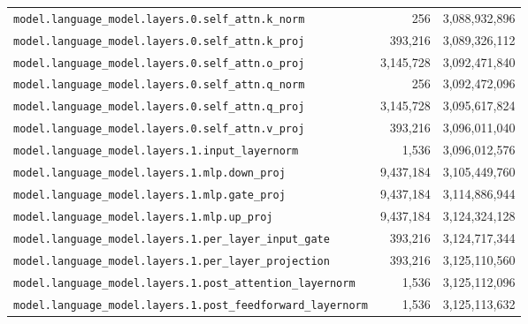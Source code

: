 \documentclass[10pt,a4paper]{article}
\theoremstyle{definition}
\begin{document}
\begin{appendices}
\begin{longtable}{p{9.5cm}rr}
\texttt{model.\allowbreak{}language\_model.\allowbreak{}layers.\allowbreak{}0.\allowbreak{}self\_attn.\allowbreak{}k\_norm} & 256 & 3,088,932,896 \\
\texttt{model.\allowbreak{}language\_model.\allowbreak{}layers.\allowbreak{}0.\allowbreak{}self\_attn.\allowbreak{}k\_proj} & 393,216 & 3,089,326,112 \\
\texttt{model.\allowbreak{}language\_model.\allowbreak{}layers.\allowbreak{}0.\allowbreak{}self\_attn.\allowbreak{}o\_proj} & 3,145,728 & 3,092,471,840 \\
\texttt{model.\allowbreak{}language\_model.\allowbreak{}layers.\allowbreak{}0.\allowbreak{}self\_attn.\allowbreak{}q\_norm} & 256 & 3,092,472,096 \\
\texttt{model.\allowbreak{}language\_model.\allowbreak{}layers.\allowbreak{}0.\allowbreak{}self\_attn.\allowbreak{}q\_proj} & 3,145,728 & 3,095,617,824 \\
\texttt{model.\allowbreak{}language\_model.\allowbreak{}layers.\allowbreak{}0.\allowbreak{}self\_attn.\allowbreak{}v\_proj} & 393,216 & 3,096,011,040 \\
\texttt{model.\allowbreak{}language\_model.\allowbreak{}layers.\allowbreak{}1.\allowbreak{}input\_layernorm} & 1,536 & 3,096,012,576 \\
\texttt{model.\allowbreak{}language\_model.\allowbreak{}layers.\allowbreak{}1.\allowbreak{}mlp.\allowbreak{}down\_proj} & 9,437,184 & 3,105,449,760 \\
\texttt{model.\allowbreak{}language\_model.\allowbreak{}layers.\allowbreak{}1.\allowbreak{}mlp.\allowbreak{}gate\_proj} & 9,437,184 & 3,114,886,944 \\
\texttt{model.\allowbreak{}language\_model.\allowbreak{}layers.\allowbreak{}1.\allowbreak{}mlp.\allowbreak{}up\_proj} & 9,437,184 & 3,124,324,128 \\
\texttt{model.\allowbreak{}language\_model.\allowbreak{}layers.\allowbreak{}1.\allowbreak{}per\_layer\_input\_gate} & 393,216 & 3,124,717,344 \\
\texttt{model.\allowbreak{}language\_model.\allowbreak{}layers.\allowbreak{}1.\allowbreak{}per\_layer\_projection} & 393,216 & 3,125,110,560 \\
\texttt{model.\allowbreak{}language\_model.\allowbreak{}layers.\allowbreak{}1.\allowbreak{}post\_attention\_layernorm} & 1,536 & 3,125,112,096 \\
\texttt{model.\allowbreak{}language\_model.\allowbreak{}layers.\allowbreak{}1.\allowbreak{}post\_feedforward\_layernorm} & 1,536 & 3,125,113,632 \\

\end{longtable}
\end{appendices}
\end{document}
